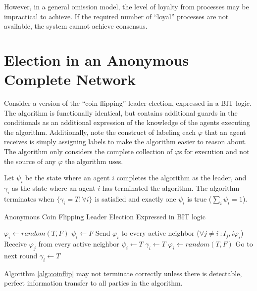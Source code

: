 However, in a general omission model, the level of loyalty from processes may be impractical to achieve.
If the required number of ``loyal'' processes are not available, the system cannot achieve consensus.

\section{Election in an Anonymous Complete Network}

Consider a version of the ``coin-flipping'' leader election, expressed in a BIT logic.
The algorithm is functionally identical, but contains additional guards in the conditionals as an additional expression of the knowledge of the agents executing the algorithm.
Additionally, note the construct of labeling each $\varphi$ that an agent receives is simply assigning labels to make the algorithm easier to reason about.
The algorithm only considers the complete collection of $\varphi$s for execution and not the source of any $\varphi$ the algorithm uses.

Let $\psi_i$ be the state where an agent $i$ completes the algorithm as the leader, and $\gamma_i$ as the state where an agent $i$ has terminated the algorithm.
The algorithm terminates when $\{\gamma_i = T : \forall i \}$ is satisfied and exactly one $\psi_i$ is true ($\sum_i \psi_i = 1$).

\begin{algorithm}
\caption{Anonymous Coin Flipping Leader Election Expressed in BIT logic}
\label{alg:coinflip}
\begin{algorithmic}[1]
\small
\State $\varphi_i \gets random(T,F)$
\State $\psi_i \gets F$
\State Send $\varphi_i$ to every active neighbor ($\forall j \neq i\ : I_j,i \varphi_i$)
\State Receive $\varphi_j$ from every active neighbor 
	\State $\psi_i \gets T$
	\State $\gamma_i \gets T$
	\State $\varphi_i \gets random(T,F)$
	\State Go to next round
	\State $\gamma_i \gets T$
\EndIf
\end{algorithmic}
\end{algorithm}

\begin{thm}
Algorithm \ref{alg:coinflip} may not terminate correctly unless there is detectable, perfect information transfer to all parties in the algorithm.
\end{thm}

